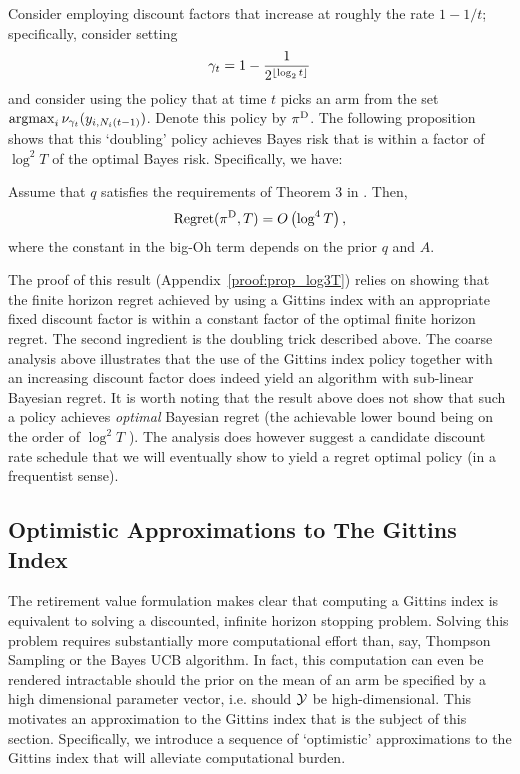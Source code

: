 Consider employing discount factors that increase at roughly the rate $1 - 1/t$; specifically, consider setting 
\[
\gamma_t = 
1 - 
\frac{1}
{2^{\floor{\log_2 t}}}%
\]
and consider using the policy that at time $t$ picks an arm from the set $\operatorname*{\mathrm{argmax}}_i \nu_{\gamma_t}(y_{i,N_i(t-1)})$. Denote this policy by $\pi^{\rm D}$. The following proposition shows that this `doubling' policy achieves Bayes risk that is within a factor of {\color{blue} $\log^2 T$} of the optimal Bayes risk. Specifically, we have:	

\begin{proposition}
	\label{prop:gittins_log3T}
	Assume that $q$ satisfies the requirements of Theorem 3 in \cite{lai1987adaptive}. Then, 
	\[
	{\rm Regret}(\pi^{\rm D},T)
	=
	O
	\left(
	\log^4 T
	\right),
	\] 
	where the constant in the big-Oh term depends on the prior $q$ and $A$.
\end{proposition}
The proof of this result (Appendix~\ref{proof:prop_log3T}) relies on showing that the finite horizon regret achieved by using a Gittins index with an appropriate fixed discount factor is within a constant factor of the optimal finite horizon regret. The second ingredient is the doubling trick described above. The coarse analysis above illustrates that the use of the Gittins index policy together with an increasing discount factor does indeed yield an algorithm with sub-linear Bayesian regret. It is worth noting that the result above does not show that such a policy achieves {\em optimal} Bayesian regret (the achievable lower bound being on the order of $\log^2T$ \citep{lai1987adaptive}). The analysis does however suggest a candidate discount rate schedule that we will eventually show to yield a regret optimal policy (in a frequentist sense). 

 
\subsection{Optimistic Approximations to The Gittins Index}\label{sec:approx_agi_deriv}

The retirement value formulation makes clear that computing a Gittins index is equivalent to solving a discounted, infinite horizon stopping problem. Solving this problem requires substantially more computational effort than, say, Thompson Sampling or the Bayes UCB algorithm. {\color{blue} In fact, this computation can even be rendered intractable should the prior on the mean of an arm be specified by a high dimensional parameter vector, i.e. should $\mathcal Y$ be high-dimensional.} This motivates an approximation to the Gittins index that is the subject of this section. Specifically, we introduce a sequence of `optimistic' approximations to the Gittins index that will alleviate computational burden. 

